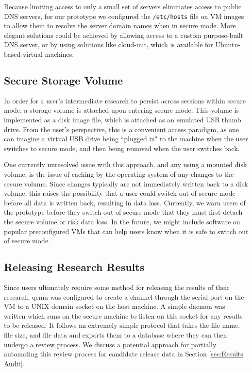 \documentclass{acm_proc_article-sp}
\begin{document}
Because limiting access to only a small set of servers eliminates access to
public DNS servers, for our prototype we configured the \texttt{/etc/hosts}
file on VM images to allow them to resolve the server domain names when in
secure mode.  More elegant solutions could be achieved by allowing access to a
custom purpose-built DNS server, or by using solutions like
cloud-init\cite{cloudinit}, which is available for Ubuntu-based virtual
machines.

\subsection{Secure Storage Volume}

In order for a user's intermediate research to persist across sessions within
secure mode, a storage volume is attached upon entering secure mode.  This
volume is implemented as a disk image file, which is attached as an emulated USB
thumb drive.  From the user's perspective, this is a convenient access paradigm,
as one can imagine a virtual USB drive being ``plugged in" to the machine when
the user switches to secure mode, and then being removed when the user switches
back.

One currently unresolved issue with this approach, and any using a mounted disk
volume, is the issue of caching by the operating system of any changes to the
secure volume.  Since changes typically are not immediately written back to a
disk volume, this raises the possibility that a user could switch out of secure
mode before all data is written back, resulting in data loss.  Currently, we
warn users of the prototype before they switch out of secure mode that they
must first detach the secure volume or risk data loss.  In the future, we might
include software on popular preconfigured VMs that can help users know when it
is safe to switch out of secure mode.

\subsection{Releasing Research Results}

Since users ultimately require some method for releasing the results of their
research, qemu was configured to create a channel through the serial port on
the VM to a UNIX domain socket on the host machine.  A simple daemon was
written which runs on the secure machine to listen on this socket for any
results to be released.  It follows an extremely simple protocol that takes the
file name, file size, and file data and exports them to a database where they
can then undergo a review process.  We discuss a potential approach for
partially automating this review process for candidate release data in Section
\ref{sec:Results Audit}.
\end{document}
